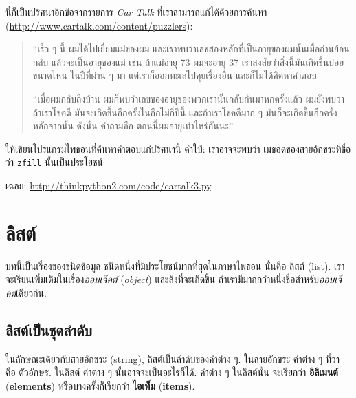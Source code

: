 \begin{exercise}
นี่ก็เป็นปริศนาอีกข้อจากรายการ {\em Car Talk} ที่เราสามารถแก้ได้ด้วยการค้นหา
(\url{http://www.cartalk.com/content/puzzlers}):

\begin{quote}
``เร็ว ๆ นี้ ผมได้ไปเยี่ยมแม่ของผม และเราพบว่าเลขสองหลักที่เป็นอายุของผมนั้นเมื่ออ่านย้อนกลับ
แล้วจะเป็นอายุของแม่ เช่น ถ้าแม่อายุ 73 ผมจะอายุ 37 เราสงสัยว่าสิ่งนี้มันเกิดขึ้นบ่อยขนาดไหน
ในปีที่ผ่าน ๆ มา แต่เราก็ออกทะเลไปคุยเรื่องอื่น และก็ไม่ได้คิดหาคำตอบ

``เมื่อผมกลับถึงบ้าน ผมก็พบว่าเลขของอายุของพวกเรานั้นกลับกันมาหกครั้งแล้ว ผมยังพบว่าถ้าเราโชคดี
มันจะเกิดขึ้นอีกครั้งในอีกไม่กี่ปีนี้ และถ้าเราโชคดีมาก ๆ มันก็จะเกิดขึ้นอีกครั้งหลักจากนั้น ดังนั้น
คำถามคือ ตอนนี้ผมอายุเท่าไหร่กันนะ''

\end{quote}

ให้เขียนโปรแกรมไพธอนที่ค้นหาคำตอบแก่ปริศนานี้ 
คำใบ้: เราอาจจะพบว่า เมธอดของสายอักขระที่ชื่อว่า {\tt zfill} นั้นเป็นประโยชน์

เฉลย: \url{http://thinkpython2.com/code/cartalk3.py}.

\end{exercise}



\chapter{ลิสต์}

บทนี้เป็นเรื่องของชนิดข้อมูล ชนิดหนึ่งที่มีประโยชน์มากที่สุดในภาษาไพธอน
นั่นคือ ลิสต์ (list).
เราจะเรียนเพิ่มเติมในเรื่อง\textit{ออบเจ๊คต์} (\textit{object})
และสิ่งที่จะเกิดขึ้น ถ้าเรามีมากกว่าหนึ่งชื่อสำหรับ\textit{ออบเจ๊คต์}เดียวกัน.


\section{ลิสต์เป็นชุดลำดับ}
\label{sequence}

ในลักษณะเดียวกับสายอักขระ (string),
ลิสต์เป็นลำดับของค่าต่าง ๆ.
ในสายอักขระ ค่าต่าง ๆ ที่ว่า คือ ตัวอักษร.
ในลิสต์ ค่าต่าง ๆ นั้นอาจจะเป็นอะไรก็ได้.
ค่าต่าง ๆ ในลิสต์นั้น จะเรียกว่า \textbf{อิลิเมนต์} (\textbf{elements})
หรือบางครั้งก็เรียกว่า \textbf{ไอเท็ม} (\textbf{items}).

